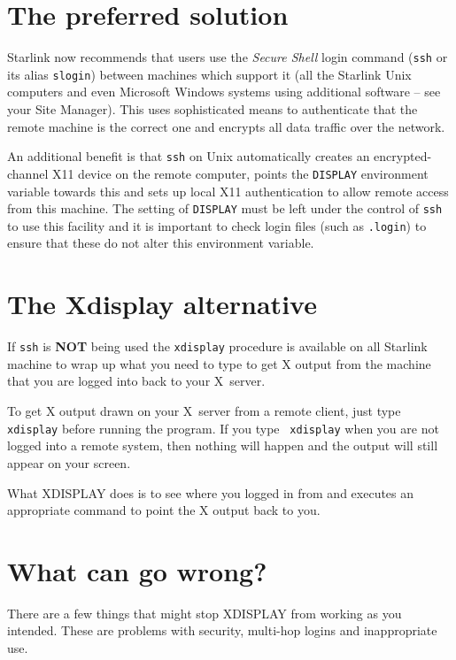 \documentclass[twoside,11pt]{article}
\newcommand{\xlabel}[1]{}
\renewcommand{\_}{\texttt{\symbol{95}}}
\begin{document}
\section{\label{ssh}\xlabel{ssh} The preferred solution}

Starlink now recommends that users use the \textit{Secure Shell} login
command (\texttt{ssh} or its alias \texttt{slogin}) between machines which
support it (all the Starlink Unix computers and even Microsoft Windows
systems using additional software -- see your Site Manager). This uses
sophisticated means to authenticate that the remote machine is the
correct one and encrypts all data traffic over the network.

An additional benefit is that \texttt{ssh} on Unix automatically creates
an encrypted-channel X11 device on the remote computer, points the
\texttt{DISPLAY} environment variable towards this and sets up local X11
authentication to allow remote access from this machine. The setting of 
\texttt{DISPLAY} must be left under the control of \texttt{ssh} to use this
facility and it is important to check login files (such as \texttt{.login})
to ensure that these do not alter this environment variable.

\section{\label{solution}\xlabel{solution}The Xdisplay alternative}

If \texttt{ssh} is \textbf{NOT} being used the \texttt{xdisplay} procedure
is available on all Starlink machine to wrap up what you need to type
to get X output from the machine that you are logged into back to your
X~server.

To get X output drawn on your X~server from a remote client, just type
\texttt{ xdisplay} before running the program.  If you type \texttt{ xdisplay}
when you are not logged into a remote system, then nothing will happen
and the output will still appear on your screen.

What XDISPLAY does is to see where you logged in from and executes an 
appropriate command to point the X output back to you. 

\section{\label{wrong}\xlabel{wrong}What can go wrong?}

There are a few things that might stop XDISPLAY from working as you intended.
These are problems with security, multi-hop logins and inappropriate use.
\end{document}
